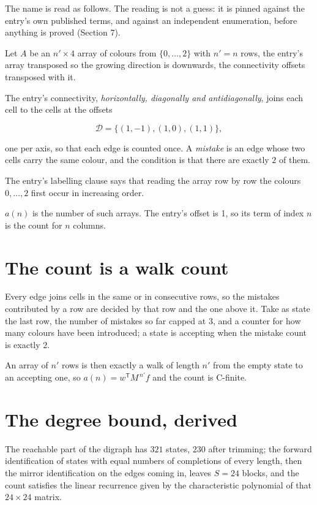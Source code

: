 \documentclass[11pt]{article}
\theoremstyle{definition}
\begin{document}
The name is read as follows. The reading is not a guess: it is pinned against the entry's own published terms, and against an independent enumeration, before anything is proved (Section 7).

Let $A$ be an $n' \times 4$ array of colours from $\{0,\dots,2\}$ with $n' = n$ rows, the entry's array transposed so the growing direction is downwards, the connectivity offsets transposed with it.

The entry's connectivity, {\itshape horizontally, diagonally and antidiagonally}, joins each cell to the cells at the offsets

\[\mathcal{D} = \{(1,-1), (1,0), (1,1)\},\]

one per axis, so that each edge is counted once. A {\itshape mistake} is an edge whose two cells carry the same colour, and the condition is that there are exactly $2$ of them.

The entry's labelling clause says that reading the array row by row the colours $0,\dots,2$ first occur in increasing order.

$a(n)$ is the number of such arrays. The entry's offset is 1, so its term of index $n$ is the count for $n$ columns.

\section{The count is a walk count}

Every edge joins cells in the same or in consecutive rows, so the mistakes contributed by a row are decided by that row and the one above it. Take as state the last row, the number of mistakes so far capped at $3$, and a counter for how many colours have been introduced; a state is accepting when the mistake count is exactly $2$.

An array of $n'$ rows is then exactly a walk of length $n'$ from the empty state to an accepting one, so $a(n) = w^{\mathsf T}M^{\,n'}f$ and the count is C-finite.

\section{The degree bound, derived}

The reachable part of the digraph has $321$ states, $230$ after trimming; the forward identification of states with equal numbers of completions of every length, then the mirror identification on the edges coming in, leaves $S = 24$ blocks, and the count satisfies the linear recurrence given by the characteristic polynomial of that $24\times24$ matrix.
\end{document}
